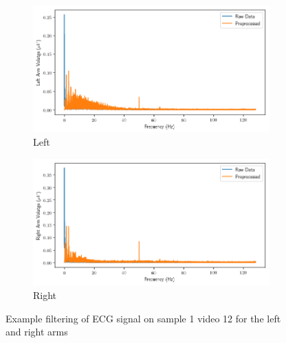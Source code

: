 \begin{figure}[h]
    \begin{subfigure}[t]{\columnwidth}
        \centering
        \includegraphics[width=\columnwidth]{tex/figures/filtering/ECG Left Arm.png}
        \caption{Left}
        \label{fig:filter:left}
    \end{subfigure}
    \hfill
    \begin{subfigure}[t]{\columnwidth}
        \centering
        \includegraphics[width=\columnwidth]{tex/figures/filtering/ECG Right Arm.png}
        \caption{Right}
        \label{fig:filter:right}
    \end{subfigure}
    \caption{Example filtering of ECG signal on sample 1 video 12
             for the left and right arms}
    \label{fig:ecg}
\end{figure}

